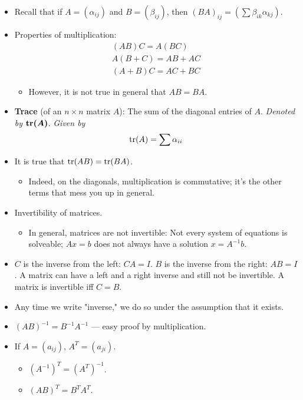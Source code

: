 \documentclass[../../notes.tex]{subfiles}
\begin{document}
\begin{itemize}
\begin{itemize}
    \end{itemize}
    \item Recall that if $A=(\alpha_{ij})$ and $B=(\beta_{ij})$, then $(BA)_{ij}=(\sum\beta_{ik}\alpha_{kj})$.
    \item Properties of multiplication:
    \begin{gather*}
        (AB)C = A(BC)\\
        A(B+C) = AB+AC\\
        (A+B)C = AC+BC
    \end{gather*}
    \begin{itemize}
        \item However, it is not true in general that $AB=BA$.
    \end{itemize}
    \item \textbf{Trace} (of an $n\times n$ matrix $A$): The sum of the diagonal entries of $A$. \emph{Denoted by} $\bm{\trace(A)}$. \emph{Given by}
    \begin{equation*}
        \trace(A) = \sum\alpha_{ii}
    \end{equation*}
    \item It is true that $\trace(AB)=\trace(BA)$.
    \begin{itemize}
        \item Indeed, on the diagonals, multiplication is commutative; it's the other terms that mess you up in general.
    \end{itemize}
    \item Invertibility of matrices.
    \begin{itemize}
        \item In general, matrices are not invertible: Not every system of equations is solveable; $Ax=b$ does not always have a solution $x=A^{-1}b$.
    \end{itemize}
    \item $C$ is the inverse from the left: $CA=I$. $B$ is the inverse from the right: $AB=I$. A matrix can have a left and a right inverse and still not be invertible. A matrix is invertible iff $C=B$.
    \item Any time we write "inverse," we do so under the assumption that it exists.
    \item $(AB)^{-1}=B^{-1}A^{-1}$ --- easy proof by multiplication.
    \item If $A=(a_{ij})$, $A^T=(a_{ji})$.
    \begin{itemize}
        \item $(A^{-1})^T=(A^T)^{-1}$.
        \item $(AB)^T=B^TA^T$.

\end{itemize}
\end{itemize}
\end{document}
